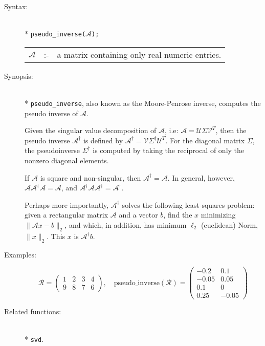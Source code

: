 \begin{description}
\item[Syntax:]\mbox{}\\*
\texttt{pseudo\_inverse($\mathcal{A}$);}\\[2mm]
\begin{tabular}{l l l} 
$\mathcal{A}$ &:-& a matrix containing only real numeric entries.
\end{tabular}

\item[Synopsis:]\mbox{}\\*
\texttt{pseudo\_inverse}, also known as the Moore-Penrose inverse, computes
the pseudo inverse of $\mathcal{A}$. 

Given the singular value decomposition of $\mathcal{A}$, i.e: $\mathcal{A} = 
\mathcal{U} 
\Sigma\mathcal{V}^T$, then the pseudo inverse $\mathcal{A}^{\dagger}$ is defined 
by $\mathcal{A}^{\dagger} = \mathcal{V} \Sigma^{\dagger} \mathcal{U}^{T}$. For the 
diagonal
matrix $\Sigma$, the pseudoinverse $\Sigma^{\dagger}$ is computed by taking the reciprocal
of only the nonzero diagonal elements.

If $\mathcal{A}$ is square and non-singular, then $\mathcal{A}^{\dagger} = \mathcal{A}$.
In general, however,
$\mathcal{A} \mathcal{A}^{\dagger} \mathcal{A} = \mathcal{A}$, and
$\mathcal{A}^{\dagger} \mathcal{A} \mathcal{A}^{\dagger} = \mathcal{A}^{\dagger}$.

Perhaps more importantly, $\mathcal{A}^{\dagger}$ solves the following least-squares
problem: given a rectangular matrix $\mathcal{A}$ and a vector $b$, find the
$x$ minimizing $\|\mathcal{A}x - b\|_2$, 
and which, in addition, has minimum $\ell_{2}$ (euclidean) Norm, $\|x\|_2$.  
This $x$ is $\mathcal{A}^{\dagger} b$.

\item[Examples:]
\begin{flushleft}
\begin{displaymath}
\mathcal{R} = \begin{pmatrix} 1 & 2 & 3 & 4 \\ 9 & 8 & 7 & 6 \end{pmatrix},
\quad
\text{pseudo\_inverse}(\mathcal{R}) =
        \begin{pmatrix} -0.2 & 0.1 \\ -0.05 & 0.05 \\ 0.1 & 0 \\ 0.25 & -0.05 \end{pmatrix} 
\end{displaymath}  
\end{flushleft}

\item[Related functions:]\mbox{}\\*
\texttt{svd}.
\end{description}

